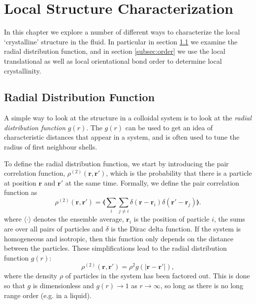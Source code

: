 \documentclass[thesis]{subfiles}
\begin{document}
\newpage


\section{Local Structure Characterization}

In this chapter we explore a number of different ways to characterize the local `crystalline' structure in the fluid. In particular in section \ref{subsec:rdf} we examine the radial distribution function, and in section \ref{subsec:order} we use the local translational as well as local orientational bond order to determine local crystallinity.

\subsection{Radial Distribution Function} \label{subsec:rdf}

A simple way to look at the structure in a colloidal system is to look at the \emph{radial distribution function} $g(r)$.  The $g(r)$ can be used to get an idea of characteristic distances that appear in a system, and is often used to tune the radius of first neighbour shells.  

To define the radial distribution function, we start by introducing the pair correlation function, 
 $\rho^{(2)}(\bm r, \bm r')$,  which is the probability that there is a particle at position $\bm r$ and $\bm r'$ at the same time. Formally, we define the pair correlation function as 
\begin{equation}
\rho^{(2)}(\bm r, \bm r') = \llangle \sum_i \sum_{j \neq i} \delta(\bm r - \bm r_i) \delta(\bm r' - \bm r_j) \rrangle.
\end{equation}
where $\langle \cdot \rangle$ denotes the ensemble average, $\bm r_i$ is the position of particle $i$, the sums are over all pairs of particles and $\delta$ is the Dirac delta function.
If the system is homogeneous and isotropic, then this function only depends on the distance between the particles. These simplifications lead to the radial distribution function $g(r)$:
\begin{equation}
\rho^{(2)}(\bm r, \bm r') = \rho^2 g(|\bm r - \bm r'|), \label{eq:gofr}
\end{equation}
where the density $\rho$ of particles in the system has been factored out. This is done so that $g$ is dimensionless and $g(r) \rightarrow 1$ as $r \rightarrow \infty$, so long as there is no long range order (e.g. in a liquid).
\end{document}
